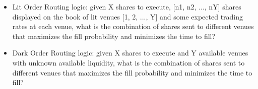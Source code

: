 \begin{itemize}
    \begin{itemize}
        \item Lit Order Routing logic: given X shares to execute, [n1, n2, ..., nY] shares displayed on the book of lit venues [1, 2, ..., Y] and some expected trading rates at each venue, what is the combination of shares sent to different venues that maximizes the fill probability and minimizes the time to fill?
        \item Dark Order Routing logic: given X shares to execute and Y available venues with unknown available liquidity, what is the combination of shares sent to different venues that maximizes the fill probability and minimizes the time to fill?
    \end{itemize}

\end{itemize}



